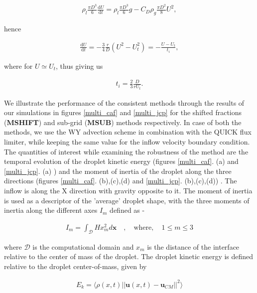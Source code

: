 \begin{align}
	\rho_l \frac{\pi D^3}6 \frac{\textrm{d}U}{\textrm{d}t} =  \rho_l \frac{\pi D^3}6 g - C_D \rho_g \frac{\pi D^2} 8  U^2, \label{borda}
\end{align}

hence

\begin{align}
\frac{\textrm{d}U}{\textrm{d}t}  = -  \frac 34 \frac {r}{D} (U^2 - U_t^2) = -\frac{U-U_t}{t_i}, \label{dtu}
\end{align}

where for $U \simeq U_t$, thus giving us 

\begin{align}
t_i =  \frac 23 \frac {D}{r U_t}.
\end{align}

We illustrate the performance of the consistent methods through the 
results of our simulations in figures \ref{multi_caf} and \ref{multi_jcp}
for the shifted fractions (\textbf{MSHIFT}) and sub-grid (\textbf{MSUB}) methods respectively. 
In case of both the methods, we use the WY advection scheme in combination with the QUICK flux limiter, 
while keeping the same value for the inflow velocity boundary condition. 
The quantities of interest while examining the robustness of the 
method are the temporal evolution of the droplet kinetic energy 
(figures \ref{multi_caf}. (a) and \ref{multi_jcp}. (a) ) 
and the moment of inertia of the droplet along the three directions 
(figures \ref{multi_caf}. (b),(c),(d) and \ref{multi_jcp}. (b),(c),(d)) . 
The inflow is along the X direction with gravity opposite to it. 
The moment of inertia is used as a descriptor of the 'average' droplet shape, 
with the three moments of inertia along the different axes $I_m$ defined as - 


\begin{align}
	I_m = \int_{\mathcal{D}} H x_m^2 d \boldsymbol{x} \quad , \quad \text{where}, \quad 1 \le m \le 3
\end{align}

where $\mathcal{D}$ is the computational domain and $x_m$ is the 
distance of the interface relative to the center of mass of the droplet.   
The droplet kinetic energy is defined relative to the droplet center-of-mass, given by 

\begin{align}
	E_k = \langle \rho(x,t) || \boldsymbol{u}(x,t) - \boldsymbol{u}_{CM}||^2 \rangle
\end{align}

